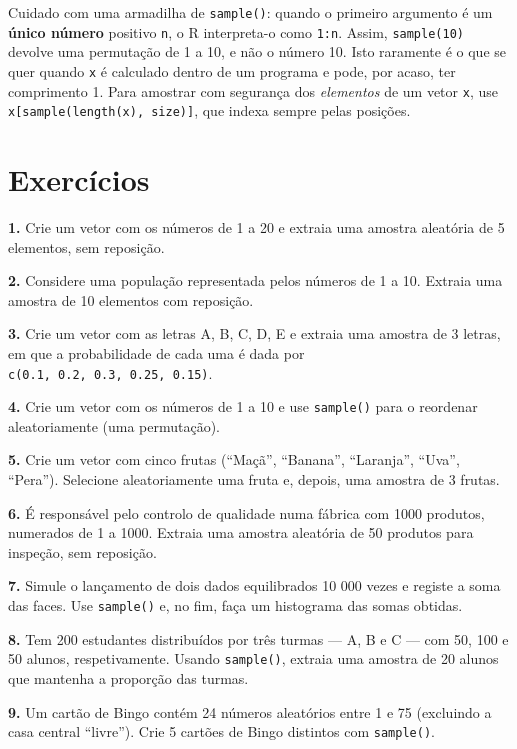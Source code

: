 \documentclass[
  portuguese,
  11pt,
  openany]{book}
\begin{document}
Cuidado com uma armadilha de \texttt{sample()}: quando o primeiro argumento é um \textbf{único
número} positivo \texttt{n}, o R interpreta-o como \texttt{1:n}. Assim, \texttt{sample(10)} devolve uma
permutação de 1 a 10, e não o número 10. Isto raramente é o que se quer quando \texttt{x} é
calculado dentro de um programa e pode, por acaso, ter comprimento 1. Para amostrar com
segurança dos \emph{elementos} de um vetor \texttt{x}, use \texttt{x{[}sample(length(x),\ size){]}}, que indexa
sempre pelas posições.

\section{Exercícios}\label{exercuxedcios-22}

\textbf{1.} Crie um vetor com os números de 1 a 20 e extraia uma amostra aleatória de 5
elementos, sem reposição.

\textbf{2.} Considere uma população representada pelos números de 1 a 10. Extraia uma
amostra de 10 elementos com reposição.

\textbf{3.} Crie um vetor com as letras A, B, C, D, E e extraia uma amostra de 3 letras, em
que a probabilidade de cada uma é dada por \texttt{c(0.1,\ 0.2,\ 0.3,\ 0.25,\ 0.15)}.

\textbf{4.} Crie um vetor com os números de 1 a 10 e use \texttt{sample()} para o reordenar
aleatoriamente (uma permutação).

\textbf{5.} Crie um vetor com cinco frutas (``Maçã'', ``Banana'', ``Laranja'', ``Uva'', ``Pera'').
Selecione aleatoriamente uma fruta e, depois, uma amostra de 3 frutas.

\textbf{6.} É responsável pelo controlo de qualidade numa fábrica com 1000 produtos,
numerados de 1 a 1000. Extraia uma amostra aleatória de 50 produtos para inspeção, sem
reposição.

\textbf{7.} Simule o lançamento de dois dados equilibrados 10 000 vezes e registe a soma das
faces. Use \texttt{sample()} e, no fim, faça um histograma das somas obtidas.

\textbf{8.} Tem 200 estudantes distribuídos por três turmas --- A, B e C --- com 50, 100 e 50
alunos, respetivamente. Usando \texttt{sample()}, extraia uma amostra de 20 alunos que mantenha
a proporção das turmas.

\textbf{9.} Um cartão de Bingo contém 24 números aleatórios entre 1 e 75 (excluindo a casa
central ``livre''). Crie 5 cartões de Bingo distintos com \texttt{sample()}.
\end{document}
